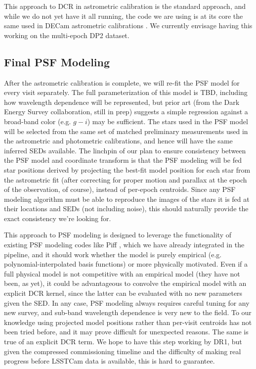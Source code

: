 \documentclass[DM,authoryear,toc]{lsstdoc}
\begin{document}
This approach to DCR in astrometric calibration is the standard approach, and while we do not yet have it all running, the code we are using is at its core the same used in DECam astrometric calibrations \citep{2017PASP..129g4503B}. 
We currently envisage having this working on the multi-epoch DP2 dataset. 

\subsection{Final PSF Modeling}

After the astrometric calibration is complete, we will re-fit the PSF model for every visit separately.
The full parameterization of this model is TBD, including how wavelength dependence will be represented, but prior art (from the Dark Energy Survey collaboration, still in prep) suggests a simple regression against a broad-band color (e.g. $g-i$) may be sufficient.
The stars used in the PSF model will be selected from the same set of matched preliminary measurements used in the astrometric and photometric calibrations, and hence will have the same inferred SEDs available.
The linchpin of our plan to ensure consistency between the PSF model and coordinate transform is that the PSF modeling will be fed star positions derived by projecting the best-fit model position for each star from the astrometric fit (after correcting for proper motion and parallax at the epoch of the observation, of course), instead of per-epoch centroids.
Since any PSF modeling algorithm must be able to reproduce the images of the stars it is fed at their locations and SEDs (not including noise), this should naturally provide the exact consistency we're looking for.

This approach to PSF modeling is designed to leverage the functionality of existing PSF modeling codes like Piff \citep{2021ascl.soft02024J}, which we have already integrated in the pipeline, and it should work whether the model is purely empirical (e.g. polynomial-interpolated basis functions) or more physically motivated.
Even if a full physical model is not competitive with an empirical model (they have not been, as yet), it could be advantageous to convolve the empirical model with an explicit DCR kernel, since the latter can be evaluated with no new parameters given the SED.
In any case, PSF modeling always requires careful tuning for any new survey, and sub-band wavelength dependence is very new to the field.
To our knowledge using projected model positions rather than per-visit centroids has not been tried before, and it may prove difficult for unexpected reasons.
The same is true of an explicit DCR term.
We hope to have this step working by DR1, but given the compressed commissioning timeline and the difficulty of making real progress before LSSTCam data is available, this is hard to guarantee.
\end{document}
